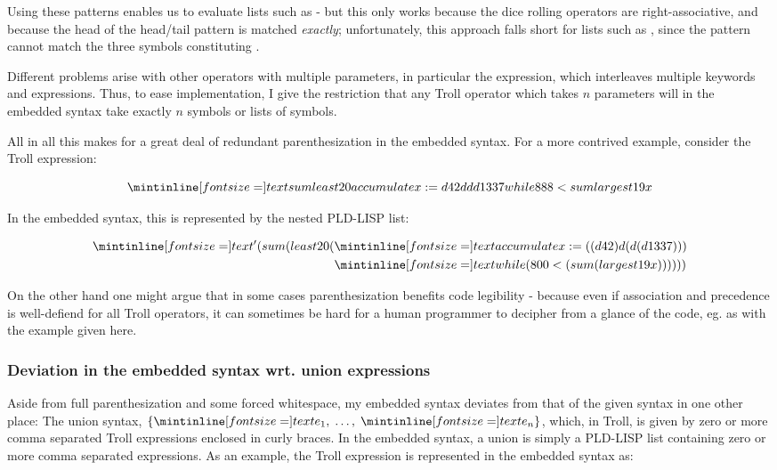 Using these patterns enables us to evaluate lists such as 
- but this only works because the dice rolling operators are right-associative,
and because the head of the head/tail pattern is matched \emph{exactly};
unfortunately, this approach falls short for lists such as ,
since the pattern  cannot match the three symbols constituting .

\smallskip

Different problems arise with other operators with multiple parameters, in
particular the  expression, which interleaves multiple keywords
and expressions. Thus, to ease implementation, I give the restriction that any
Troll operator which takes $n$ parameters will in the embedded syntax take
exactly $n$ symbols or lists of symbols.

\newpage

All in all this makes for a great deal of redundant parenthesization in the
embedded syntax. For a more contrived example, consider the Troll expression:

$$\ms{sum least 20 accumulate x := d42 d d d1337 while 888 < sum largest 19 x}$$

In the embedded syntax, this is represented by the nested PLD-LISP list:

\begin{align*}
  \ms{'(sum (least 20 (}&\ms{accumulate x := ((d 42) d (d (d 1337)))}\\
  &\ms{while (800 < (sum (largest 19 x))))))}
\end{align*}

On the other hand one might argue that in some cases parenthesization benefits
code legibility - because even if association and precedence is well-defiend for
all Troll operators, it can sometimes be hard for a human programmer to decipher
from a glance of the code, eg. as with the example given here.

\subsubsection{Deviation in the embedded syntax wrt. union expressions}

Aside from full parenthesization and some forced whitespace, my embedded syntax
deviates from that of the given syntax in one other place: The union syntax,
$\{\ms e_1,\; \dots,\; \ms e_n\}$, which, in Troll, is given by zero or more
comma separated Troll expressions enclosed in curly braces. In the embedded
syntax, a union is simply a PLD-LISP list containing zero or more comma
separated expressions. As an example, the Troll expression  is represented in the embedded syntax as:


